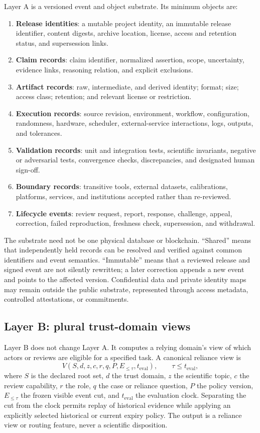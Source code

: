 \documentclass[11pt]{article}
\begin{document}
Layer A is a versioned event and object substrate. Its minimum objects are:

\begin{enumerate}
  \item \textbf{Release identities}: a mutable project identity, an immutable release identifier, content digests, archive location, license, access and retention status, and supersession links.
  \item \textbf{Claim records}: claim identifier, normalized assertion, scope, uncertainty, evidence links, reasoning relation, and explicit exclusions.
  \item \textbf{Artifact records}: raw, intermediate, and derived identity; format; size; access class; retention; and relevant license or restriction.
  \item \textbf{Execution records}: source revision, environment, workflow, configuration, randomness, hardware, scheduler, external-service interactions, logs, outputs, and tolerances.
  \item \textbf{Validation records}: unit and integration tests, scientific invariants, negative or adversarial tests, convergence checks, discrepancies, and designated human sign-off.
  \item \textbf{Boundary records}: transitive tools, external datasets, calibrations, platforms, services, and institutions accepted rather than re-reviewed.
  \item \textbf{Lifecycle events}: review request, report, response, challenge, appeal, correction, failed reproduction, freshness check, supersession, and withdrawal.
\end{enumerate}

The substrate need not be one physical database or blockchain. ``Shared'' means that independently held records can be resolved and verified against common identifiers and event semantics. ``Immutable'' means that a reviewed release and signed event are not silently rewritten; a later correction appends a new event and points to the affected version. Confidential data and private identity maps may remain outside the public substrate, represented through access metadata, controlled attestations, or commitments.

\subsection{Layer B: plural trust-domain views}

Layer B does not change Layer A. It computes a relying domain's view of which actors or reviews are eligible for a specified task. A canonical reliance view is
\[
V(S,d,z,c,r,q,P,E_{\leq\tau},t_{\mathrm{eval}}), \qquad \tau\leq t_{\mathrm{eval}},
\]
where $S$ is the declared root set, $d$ the trust domain, $z$ the scientific topic, $c$ the review capability, $r$ the role, $q$ the case or reliance question, $P$ the policy version, $E_{\leq\tau}$ the frozen visible event cut, and $t_{\mathrm{eval}}$ the evaluation clock. Separating the cut from the clock permits replay of historical evidence while applying an explicitly selected historical or current expiry policy. The output is a reliance view or routing feature, never a scientific disposition.
\end{document}
